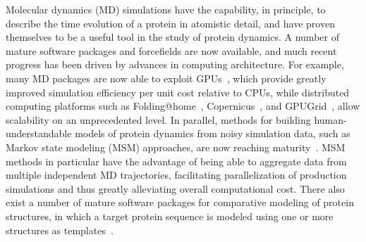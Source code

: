 \documentclass[aps,pre,twocolumn,nofootinbib,superscriptaddress,linenumbers]{revtex4-1}
\begin{document}
Molecular dynamics (MD) simulations have the capability, in principle, to describe the time evolution of a protein in atomistic detail, and have proven themselves to be a useful tool in the study of protein dynamics.
A number of mature software packages and forcefields are now available, and much recent progress has been driven by advances in computing architecture.
For example, many MD packages are now able to exploit GPUs~\cite{eastman:jctc:2012:openmm,walker:jctc:2013:amber-gpu}, which provide greatly improved simulation efficiency per unit cost relative to CPUs, while distributed computing platforms such as Folding@home~\cite{shirts-pande:science:2000:fah}, Copernicus~\cite{pronk:2011:copernicus,pronk:2015:copernicus}, and GPUGrid~\cite{buch:2010:gpugrid}, allow scalability on an unprecedented level.
In parallel, methods for building human-understandable models of protein dynamics from noisy simulation data, such as Markov state modeling (MSM) approaches, are now reaching maturity~\cite{pande-beauchamp-bowman:2010:methods:markov-model-review,noe:jcp:2011:msm-review,chodera-noe:curr-opin-struct-biol:2014:msm-review}.
MSM methods in particular have the advantage of being able to aggregate data from multiple independent MD trajectories, facilitating parallelization of production simulations and thus greatly alleviating overall computational cost.
\color{red}
There also exist a number of mature software packages for comparative modeling of protein structures, in which a target protein sequence is modeled using one or more structures as templates~\cite{moult:proteins:2014:casp10,baker:science:2001:structure-prediction-review,baker:structure:2013:rosettacm,yang:nature-methods:2015:i-tasser-suite}.
\color{black}
\end{document}
